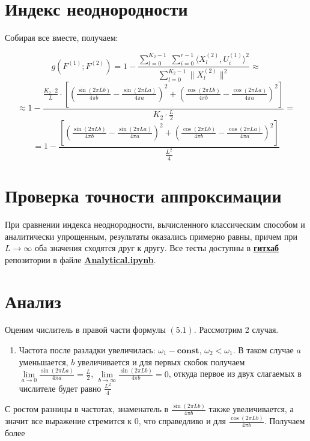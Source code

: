 \documentclass[specialist, substylefile = spbu.rtx,
			   subf, href, 12pt]{disser}
\begin{document}
\section{Индекс неоднородности}
Собирая все вместе, получаем:

$$ g(F^{(1)}; F^{(2)}) = 1 - \frac{\sum\limits_{l=0}^{K_2-1}\;\sum\limits_{i=0}^{r-1}\langle X_l^{(2)}, U_i^{(1)}\rangle^2}{\sum\limits_{l=0}^{K_2-1}\|X_l^{(2)}\|^2} \approx $$
$$ \approx 1 - \frac{\frac{K_2 \cdot 2}{L} \cdot \left[ \left(  \frac{\sin(2\pi Lb)}{4\pi b} - \frac{\sin(2\pi La)}{4\pi a}   \right)^2 + \left(  \frac{\cos(2\pi Lb)}{4\pi b} - \frac{\cos(2\pi La)}{4\pi a}  \right)^2 \right]}{K_2\cdot\frac{L}{2}} = $$
$$ = 1 - \frac{\left[ \left(  \frac{\sin(2\pi Lb)}{4\pi b} - \frac{\sin(2\pi La)}{4\pi a}   \right)^2 + \left(  \frac{\cos(2\pi Lb)}{4\pi b} - \frac{\cos(2\pi La)}{4\pi a}  \right)^2 \right]}{\frac{L^2}{4}} $$


\section{Проверка точности аппроксимации}
При сравнении индекса неоднородности, вычисленного классическим способом и аналитически упрощенным, результаты оказались примерно равны, причем при $L \rightarrow \infty $ оба значения сходятся друг к другу. Все тесты доступны в \href{https://github.com/Loulaan/researchWork}{\textbf{гитхаб}} репозитории в файле \href{https://github.com/Loulaan/researchWork/blob/main/Analytical.ipynb}{\textbf{Analytical.ipynb}}.


\section{Анализ}
Оценим числитель в правой части формулы $(5.1)$. 
Рассмотрим 2 случая.
\begin{enumerate}
	\item Частота после разладки увеличилась: $ \omega_1 - \mathbf{const}$, $ \omega_2 < \omega_1 $. В таком случае $ a $ уменьшается, $ b $ увеличивается и для первых скобок получаем $ \lim\limits_{a \rightarrow 0} \frac{\sin(2\pi La)}{4\pi a} = \frac{L}{2} $, $  \lim\limits_{b \rightarrow \infty} \frac{\sin(2\pi Lb)}{4\pi b} = 0 $, откуда первое из двух слагаемых в числителе будет равно $ \frac{L^2}{4} $
\end{enumerate}
С ростом разницы в частотах, знаменатель в $\frac{\sin(2\pi Lb)}{4\pi b}$ также увеличивается, а значит все выражение стремится к 0, что справедливо и для $\frac{\cos(2\pi Lb)}{4\pi b}$. Получаем более 
\end{document}

